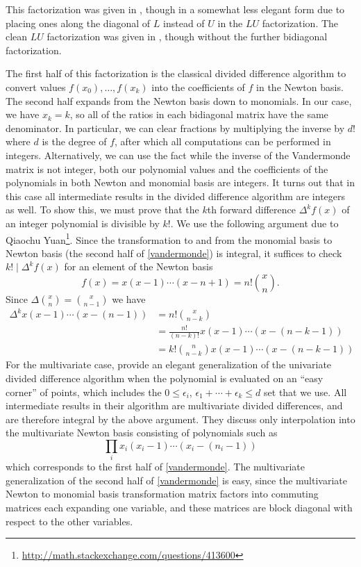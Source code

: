 \documentclass[11pt]{article}
\begin{document}
This factorization was given in \cite{oruc2000explicit}, though in a somewhat less elegant form due to placing ones along the diagonal of $L$ instead of $U$ in the $LU$ factorization.
The clean $LU$ factorization was given in \cite{olver2006multivariate}, though without the further bidiagonal factorization.

The first half of this factorization is the classical divided difference algorithm to convert values $f(x_0), \ldots, f(x_k)$ into the coefficients of $f$ in the Newton
basis.  The second half expands from the Newton basis down to monomials.  In our case, we have $x_k = k$, so all of the ratios in each bidiagonal matrix have the same denominator.
In particular, we can clear fractions by multiplying the inverse by $d!$ where $d$ is the degree of $f$, after which all computations can be performed in integers.  Alternatively,
we can use the fact while the inverse of the Vandermonde matrix is not integer, both our polynomial values and the coefficients of the polynomials in both Newton and monomial basis
are integers.  It turns out that in this case all intermediate results in the divided difference algorithm are integers as well.  To show this, we must prove that the $k$th forward
difference $\Delta^k f(x)$ of an integer polynomial is divisible by $k!$.  We use the following argument due to Qiaochu Yuan\footnote{\url{http://math.stackexchange.com/questions/413600}}.
Since the transformation to and from the monomial basis to Newton basis (the second half of \autoref{vandermonde}) is integral, it suffices to check $k! \mid \Delta^k f(x)$ for an
element of the Newton basis
$$f(x) = x(x-1)\cdots(x-n+1) = n!\binom{x}{n}.$$
Since $\Delta \binom{x}{n} = \binom{x}{n-1}$ we have
\begin{align*}
\Delta^k x(x-1)\cdots(x-(n-1))
  &= n! \binom{x}{n-k} \\
  &= \frac{n!}{(n-k)!} x(x-1)\cdots(x-(n-k-1)) \\
  &= k! \binom{n}{n-k} x(x-1)\cdots(x-(n-k-1))
\end{align*}
For the multivariate case, \cite{neidinger2009multivariable} provide an elegant generalization of the univariate divided difference algorithm when the polynomial is
evaluated on an ``easy corner'' of points, which includes the $0 \le \epsilon_i$, $\epsilon_1 + \cdots + \epsilon_k \le d$ set that we use.  All intermediate results
in their algorithm are multivariate divided differences, and are therefore integral by the above argument.  They discuss only interpolation into the multivariate Newton basis
consisting of polynomials such as
$$\prod_i x_i(x_i-1)\cdots(x_i-(n_i-1))$$
which corresponds to the first half of \autoref{vandermonde}.  The multivariate generalization of the second half of \autoref{vandermonde} is easy, since the multivariate Newton to
monomial basis transformation matrix factors into commuting matrices each expanding one variable, and these matrices are block diagonal with respect to the other variables.
\end{document}
